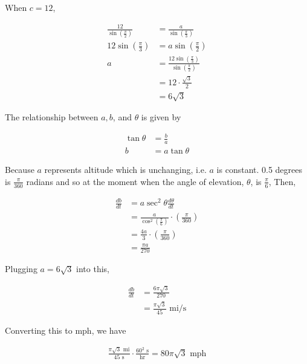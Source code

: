\documentclass{article}
\begin{document}
    \pagebreak

    When $c=12$,

    \begin{align*}
        \frac{12}{\sin{\left(\frac{\pi}{2}\right)}} &= \frac{a}{\sin{\left(\frac{\pi}{3}\right)}} \\
        12\sin{\left(\frac{\pi}{3}\right)}          &= a\sin{\left(\frac{\pi}{2}\right)} \\
        a                                           &= \frac{12\sin{\left(\frac{\pi}{3}\right)}}{\sin{\left(\frac{\pi}{2}\right)}} \\
                                                    &= 12 \cdot \frac{\sqrt{3}}{2} \\
                                                    &= 6\sqrt{3}
    \end{align*}

    The relationship between $a,b$, and $\theta$ is given by

    \begin{align*}
        \tan{\theta} &= \frac{b}{a} \\
        b            &= a \tan{\theta}
    \end{align*}

    Because $a$ represents altitude which is unchanging, i.e. $a$ is constant. 0.5 degrees is $\frac{\pi}{360}$ radians and so at the moment when the angle of elevation, $\theta$, is $\frac{\pi}{6}$, Then,

    \begin{align*}
        \frac{db}{dt}   &= a \sec^2{\theta}\frac{d\theta}{dt} \\
                        &= \frac{a}{\cos^2{\left(\frac{\pi}{6}\right)}}\cdot \left(\frac{\pi}{360}\right) \\
                        &= \frac{4a}{3}\cdot \left(\frac{\pi}{360}\right) \\
                        &= \frac{\pi a}{270}
    \end{align*}

    Plugging $a=6\sqrt{3}$ into this,

    \begin{align*}
        \frac{db}{dt}   &= \frac{6\pi\sqrt{3}}{270} \\
                        &= \frac{\pi\sqrt{3}}{45} \text{ mi/s}
    \end{align*}

    Converting this to mph, we have

    \begin{align*}
        \frac{\pi\sqrt{3}\text{ mi}}{45\text{ s}}   \cdot \frac{60^2 \text{ s}}{\text{hr}} = 80\pi\sqrt{3} \text{ mph}
    \end{align*}
\end{document}
